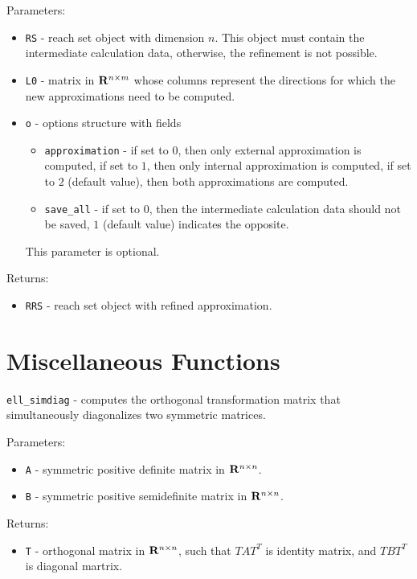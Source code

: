 \documentclass{report}
\begin{document}
Parameters:
\begin{itemize}
\item {\tt RS} - reach set object with dimension $n$. This object must
contain the intermediate calculation data, otherwise, the refinement
is not possible.
\item {\tt L0} - matrix in ${\bf R}^{n\times m}$ whose columns represent the
directions for which the new approximations need to be computed.
\item {\tt o} - options structure with fields
\begin{itemize}
\item {\tt approximation} - if set to $0$, then only external approximation
is computed, if set to $1$, then only internal approximation is computed,
if set to $2$ (default value), then both approximations are computed.
\item {\tt save\_all} - if set to $0$, then the intermediate calculation
data should not be saved, $1$ (default value) indicates the opposite.
\end{itemize}
This parameter is optional.
\end{itemize}

Returns:
\begin{itemize}
\item {\tt RRS} - reach set object with refined approximation.
\end{itemize}

\newpage

\section{Miscellaneous Functions}
{\Large {\tt ell\_simdiag}} - computes the orthogonal transformation matrix
that simultaneously diagonalizes two symmetric matrices.

Parameters:
\begin{itemize}
\item {\tt A} - symmetric positive definite matrix in ${\bf R}^{n\times n}$.
\item {\tt B} - symmetric positive semidefinite matrix in ${\bf R}^{n\times n}$.
\end{itemize}

Returns:
\begin{itemize}
\item {\tt T} - orthogonal matrix in ${\bf R}^{n\times n}$, such that
$TAT^T$ is identity matrix, and $TBT^T$ is diagonal martrix.
\end{itemize}
\end{document}
